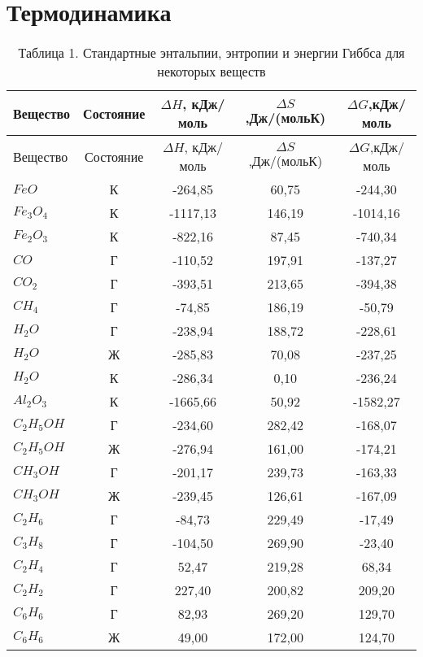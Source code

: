 \section*{Термодинамика}
\begin{longtable}[h]{|p{3cm}|c|c|c|c|}
%
\caption{Таблица 1. Стандартные энтальпии, энтропии и энергии Гиббса для некоторых веществ}\label{tabular:termod}\\
\hline
Вещество &	Состояние &$\Delta H$, кДж/моль &$\Delta S$,Дж/(мольК)& $\Delta G$,кДж/моль\\
\hline\endfirsthead
\hline
Вещество &	Состояние &$\Delta H$, кДж/моль &$\Delta S$,Дж/(мольК)& $\Delta G$,кДж/моль\\
\endhead
$FeO$ & К & -264,85 & 60,75 & -244,30\\ 
 \hline $Fe_{3}O_{4}$ & К & -1117,13 & 146,19 & -1014,16\\ 
 \hline $Fe_{2}O_{3}$ & К & -822,16 & 87,45 & -740,34\\ 
 \hline $CO$ & Г & -110,52 & 197,91 & -137,27\\ 
 \hline $CO_{2}$ & Г & -393,51 & 213,65 & -394,38\\ 
 \hline $CH_{4}$ & Г & -74,85 & 186,19 & -50,79\\ 
 \hline $H_{2}O$ & Г & -238,94 & 188,72 & -228,61\\ 
 \hline $H_{2}O$ & Ж & -285,83 & 70,08 & -237,25\\ 
 \hline $H_{2}O$ & К & -286,34 & 0,10 & -236,24\\ 
 \hline $Al_{2}O_{3}$ & К & -1665,66 & 50,92 & -1582,27\\ 
 \hline $C_{2}H_{5}OH$ & Г & -234,60 & 282,42 & -168,07\\ 
 \hline $C_{2}H_{5}OH$ & Ж & -276,94 & 161,00 & -174,21\\ 
 \hline $CH_{3}OH$ & Г & -201,17 & 239,73 & -163,33\\ 
 \hline $CH_{3}OH$ & Ж & -239,45 & 126,61 & -167,09\\ 
 \hline $C_{2}H_{6}$ & Г & -84,73 & 229,49 & -17,49\\ 
 \hline $C_{3}H_{8}$ & Г & -104,50 & 269,90 & -23,40\\ 
 \hline $C_{2}H_{4}$ & Г & 52,47 & 219,28 & 68,34\\ 
 \hline $C_{2}H_{2}$ & Г & 227,40 & 200,82 & 209,20\\ 
 \hline $C_{6}H_{6}$ & Г & 82,93 & 269,20 & 129,70\\ 
 \hline $C_{6}H_{6}$ & Ж & 49,00 & 172,00 & 124,70\\ 

\end{longtable}
